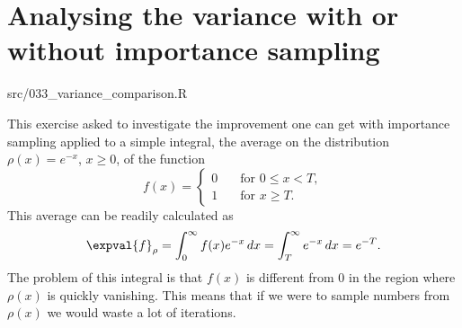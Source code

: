 \section{Analysing the variance with or without importance sampling}%
\label{ex:033}

\begin{sourcefiles}
  \item[Analysis scripts] src/033\_variance\_comparison.R
\end{sourcefiles}

This exercise asked to investigate the improvement one can get with importance
sampling applied to a simple integral, the average on the distribution $\rho(x)
= e^{-x}$, $x \geq 0$, of the function
\begin{equation}
  f(x) =
  \begin{cases}
    0 &\quad \text{for } 0 \leq x < T, \\
    1 &\quad \text{for } x \geq T.
  \end{cases}
\end{equation}
This average can be readily calculated as
\begin{equation}
  \expval{f}_{\rho} = \int_{0}^{\infty} f(x) e^{-x} \, dx = \int_{T}^{\infty}
  e^{-x}\, dx = e^{-T}.
\end{equation}
The problem of this integral is that $f(x)$ is different from $0$ in the region
where $\rho(x)$ is quickly vanishing. This means that if we were to sample
numbers from $\rho(x)$ we would waste a lot of iterations.

